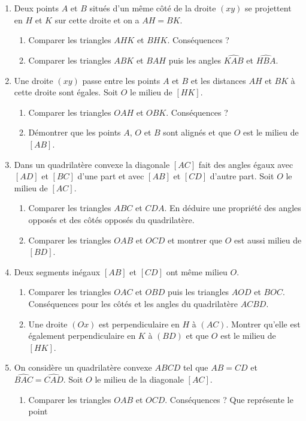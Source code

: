 \begin{enumerate}
\begin{enumerate}
\end{enumerate}
\item Deux points $A$ et $B$ situés d'un même côté de la droite $(xy)$ se projettent
en $H$ et $K$ sur cette droite et on a $AH=BK$. \begin{enumerate}
\item Comparer les triangles $AHK$ et $BHK$. Conséquences ? 
\item Comparer les triangles $ABK$ et $BAH$ puis les angles $\widehat{KAB}$ et $\widehat{HBA}$. 
\end{enumerate}
\item Une droite $(xy)$ passe entre les points $A$ et $B$ et les distances $AH$ et $BK$ à cette droite sont égales. Soit $O$ le milieu de $[HK]$. \begin{enumerate}
\item Comparer les triangles $OAH$ et $OBK$. Conséquences ? 
\item Démontrer que les points $A$, $O$ et $B$ sont alignés et que $O$ est le milieu de $[AB]$. 
\end{enumerate}
\item Dans un quadrilatère convexe la diagonale $[AC]$ fait des angles égaux avec $[AD]$ et $[BC]$ d'une part et avec $[AB]$ et $[CD]$ d'autre part. Soit $O$ le milieu de $[AC]$. \begin{enumerate}
\item Comparer les triangles $ABC$ et $CDA$. En déduire une propriété des angles opposés et des côtés opposés du quadrilatère. 
\item Comparer les triangles $OAB$ et $OCD$ et montrer que $O$ est aussi milieu de $[BD]$. 
\end{enumerate}
\item Deux segments inégaux $[AB]$ et $[CD]$ ont même milieu $O$. \begin{enumerate}
\item Comparer les triangles $OAC$ et $OBD$ puis les triangles $AOD$ et $BOC$. Conséquences pour les côtés et les angles du quadrilatère $ACBD$. 
\item Une droite $(Ox)$ est perpendiculaire en $H$ à $(AC)$. Montrer qu'elle est également perpendiculaire en $K$ à $(BD)$ et que $O$ est le milieu de $[HK]$. 
\end{enumerate}
\item On considère un quadrilatère convexe $ABCD$ tel que $AB=CD$ et $\widehat{BAC}=\widehat{CAD}$. Soit $O$ le milieu de la diagonale $[AC]$.\begin{enumerate}
\item Comparer les triangles $OAB$ et $OCD$. Conséquences ? Que représente le point 

\end{enumerate}
\end{enumerate}
